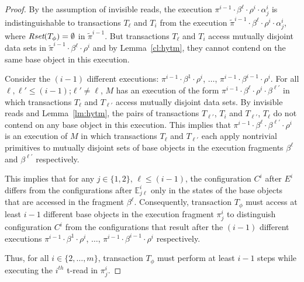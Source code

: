 \begin{proof}
By the assumption of invisible reads,
the execution $\pi^{i-1}\cdot \beta^{\ell}\cdot \rho^i \cdot \alpha_j^i$
is indistinguishable to
transactions $T_{\ell}$ and $T_{i}$
from the execution ${\tilde \pi}^{i-1}\cdot \beta^{\ell}\cdot \rho^i \cdot \alpha_j^i$, where $\textit{Rset}(T_{\phi})=\emptyset$
in ${\tilde \pi}^{i-1}$.
But transactions $T_{\ell}$ and $T_{i}$ access mutually disjoint data sets in ${\tilde \pi}^{i-1}\cdot \beta^{\ell}\cdot \rho^i$ and by Lemma~\ref{cl:hytm},
they cannot contend on the same base object in this execution.

Consider the $(i-1)$ different executions: 
$\pi^{i-1}\cdot\beta^{1}\cdot \rho^i$, $\ldots$, $\pi^{i-1}\cdot\beta^{i-1}\cdot \rho^i$.
For all $\ell, \ell' \leq (i-1)$;$\ell' \neq \ell$, 
$M$ has an execution of the form $\pi^{i-1}\cdot \beta^{\ell}\cdot \rho^i \cdot \beta^{\ell'}$
in which transactions $T_{\ell}$ and $T_{\ell'}$ access mutually disjoint data sets.
By invisible reads and Lemma~\ref{lm:hytm}, the pairs of transactions $T_{\ell'}$, $T_{i}$ and $T_{\ell'}$, $T_{\ell}$
do not contend on any base object in this execution.
This implies that $\pi^{i-1}\cdot \beta^{\ell} \cdot \beta^{\ell'} \cdot \rho^i$ is an execution of $M$ in which
transactions $T_{\ell}$ and $T_{\ell'}$ each apply nontrivial primitives
to mutually disjoint sets of base objects in the execution fragments $\beta^{\ell}$ and $\beta^{\ell'}$ respectively.

This implies that for any $j\in \{1,2\}$, $\ell \leq (i-1)$, the configuration $C^i$ after $E^i$ differs from the configurations
after $\mathbb{E}_{j\ell}^{i}$ only in the states of the base objects that are accessed in the fragment $\beta^{\ell}$.
Consequently, transaction $T_{\phi}$ must access at least $i-1$ different base objects
in the execution fragment $\pi_j^i$
to distinguish configuration $C^i$ from the configurations
that result after the $(i-1)$ different executions 
$\pi^{i-1}\cdot\beta^{1}\cdot \rho^i$, $\ldots$, $\pi^{i-1}\cdot\beta^{i-1}\cdot \rho^i$ respectively.

Thus, for all $i \in \{2,\ldots, m\}$, transaction $T_{\phi}$ must perform at least $i-1$ steps 
while executing the $i^{th}$ t-read in $\pi_{j}^i$.


\end{proof}

